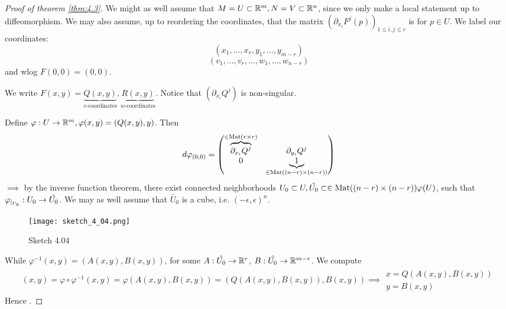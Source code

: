 \begin{proof}[Proof of theorem \ref{thm:4.3}]
     We might as well assume that \(M=U\subset \mathbb{R}^m,N=V\subset\mathbb{R}^n\), since we only make a local statement up to diffeomorphism.
    We may also assume, up to reordering the coordinates, that the matrix \((\partial_{x_i}F^j(p))_{1\leq i,j\leq r}\)
    is  for \(p\in U\). We label our coordinates:  \[(x_1,\dots,x_r,y_1,\dots,y_{m-r})\] 
    \[(v_1,\dots,v_r,\dots,w_1,\dots,w_{n-r})\]
    and wlog \(F(0,0)=(0,0)\).

    We write \(F(x,y)=\underbrace{Q(x,y)}_{v\text{-coordinates}},\underbrace{R(x,y)}_{w\text{-coordinates}}\). Notice that \((\partial_{x_i}Q^j)\)
    is non-singular.

     Define \(\varphi:U\to\mathbb{R}^m,\varphi(x,y)=(Q(x,y),y)\). Then \begin{align*}
        d\varphi_{(0,0)}=\begin{pmatrix}
            \overbrace{\partial_{x_i}Q^j}^{\in {\text{Mat}}(r\times r)} & \partial_{y_i}Q^j\\
            0 & \underbrace{1}_{\in {\text{Mat}}((n-r)\times (n-r))}
        \end{pmatrix}
    \end{align*}
    \(\implies\) by the inverse function theorem, there  exist connected neighborhoods \(U_0\subset U,\tilde{U_0}\subset \in {\text{Mat}}((n-r)\times (n-r))\varphi(U)\),
    such that \(\varphi_{|_{U_0}}:U_0\to\tilde{U_0}\). We may as well assume that \(\tilde{U_0}\) is a cube, i.e. \((-\epsilon,\epsilon)^n\).
    \begin{figure}[H]
        \centering
        \texttt{[image: sketch\_4\_04.png]}
        \caption{Sketch 4.04}
    \end{figure}
    While \(\varphi^{-1}(x,y)=(A(x,y),B(x,y))\), for some \(A:\tilde{U_0}\to\mathbb{R}^r\), \(B:\tilde{U_0}\to\mathbb{R}^{m-r}\).
    We compute \begin{align*}
        (x,y)=\varphi\circ\varphi^{-1}(x,y)=\varphi\left(A(x,y),B(x,y)\right)=(Q(A(x,y),B(x,y)),B(x,y))\implies \substack{x=Q(A(x,y),B(x,y))\\y=B(x,y)}
    \end{align*}
    Hence .


\end{proof}

